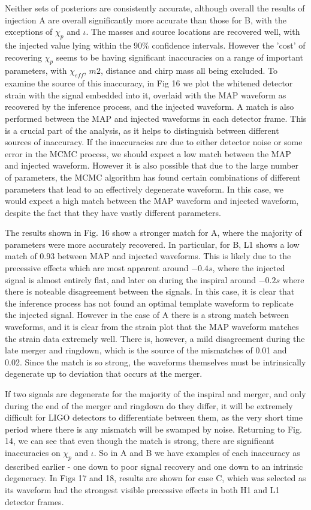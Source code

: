 \documentclass[11pt]{article}
\begin{document}
Neither sets of posteriors are consistently accurate, although overall the results of injection A are overall significantly more accurate than those for B, with the exceptions of $\chi_p$ and $\iota$. The masses and source locations are recovered well, with the injected value lying within the 90\% confidence intervals. However the 'cost' of recovering $\chi_p$ seems to be having significant inaccuracies on a range of important parameters, with $\chi_{eff}$, $m2$, distance and chirp mass all being excluded. To examine the source of this inaccuracy, in Fig 16 we plot the whitened detector strain with the signal embedded into it, overlaid with the MAP waveform as recovered by the inference process, and the injected waveform. A match is also performed between the MAP and injected waveforms in each detector frame. This is a crucial part of the analysis, as it helps to distinguish between different sources of inaccuracy. If the inaccuracies are due to either detector noise or some error in the MCMC process, we should expect a low match between the MAP and injected waveform. However it is also possible that due to the large number of parameters, the MCMC algorithm has found certain combinations of different parameters that lead to an effectively degenerate waveform. In this case, we would expect a high match between the MAP waveform and injected waveform, despite the fact that they have vastly different parameters.



The results shown in Fig. 16 show a stronger match for A, where the majority of parameters were more accurately recovered. In particular, for B, L1 shows a low match of 0.93 between MAP and injected waveforms. This is likely due to the precessive effects which are most apparent around $-0.4s$, where the injected signal is almost entirely flat, and later on during the inspiral around $-0.2s$ where there is noteable disagreement between the signals. In this case, it is clear that the inference process has not found an optimal template waveform to replicate the injected signal. However in the case of A there is a strong match between waveforms, and it is clear from the strain plot that the MAP waveform matches the strain data extremely well. There is, however, a mild disagreement during the late merger and ringdown, which is the source of the mismatches of 0.01 and 0.02. Since the match is so strong, the waveforms themselves must be intrinsically degenerate up to deviation that occurs at the merger.

If two signals are degenerate for the majority of the inspiral and merger, and only during the end of the merger and ringdown do they differ, it will be extremely difficult for LIGO detectors to differentiate between them, as the very short time period where there is any mismatch will be swamped by noise. Returning to Fig. 14, we can see that even though the match is strong, there are significant inaccuracies on $\chi_p$ and $\iota$. So in A and B we have examples of each inaccuracy as described earlier - one down to poor signal recovery and one down to an intrinsic degeneracy. In Figs 17 and 18, results are shown for case C, which was selected as its waveform had the strongest visible precessive effects in both H1 and L1 detector frames.
\end{document}
